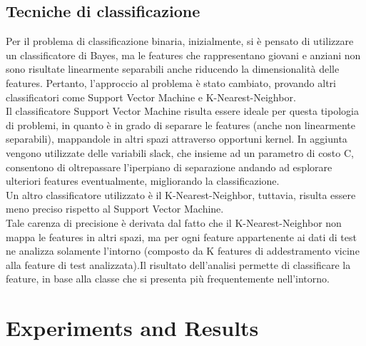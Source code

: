 \documentclass[12pt]{IEEEtran}
\begin{document}
\subsection{Tecniche di classificazione}
Per il problema di classificazione binaria, inizialmente, si è pensato di utilizzare un classificatore di Bayes, ma le features che rappresentano giovani e anziani non sono risultate linearmente separabili anche riducendo la dimensionalità delle features. Pertanto, l'approccio al problema è stato cambiato, provando altri classificatori come Support Vector Machine e K-Nearest-Neighbor. \\
Il classificatore Support Vector Machine risulta essere ideale per questa tipologia di problemi, in quanto è in grado di separare le features (anche non linearmente separabili), mappandole in altri spazi attraverso opportuni kernel. In aggiunta vengono utilizzate  delle variabili slack, che insieme ad un parametro di costo C, consentono di oltrepassare l'iperpiano di separazione andando ad esplorare ulteriori features eventualmente, migliorando la classificazione. \\
Un altro classificatore utilizzato è il K-Nearest-Neighbor, tuttavia, risulta essere meno preciso rispetto al Support Vector Machine. \\
Tale carenza di precisione è derivata dal fatto che il K-Nearest-Neighbor non mappa le features in altri spazi, ma per ogni feature appartenente ai dati di test ne analizza solamente l'intorno (composto da K features di addestramento vicine alla feature di test analizzata).Il risultato dell'analisi permette di classificare la feature, in base alla classe che si presenta più frequentemente nell'intorno. 


\section{Experiments and Results}
\end{document}
